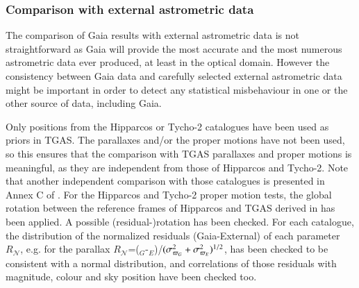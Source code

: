 
\subsubsection{Comparison with external astrometric data}\label{sec:wp944_astrom}

The comparison of Gaia results with external astrometric data is not straightforward as Gaia will provide the most accurate and the most numerous astrometric data ever produced, at least in the optical domain. However the consistency between Gaia data and carefully selected external astrometric data might be important in order to detect any statistical misbehaviour in one or the other source of data, including Gaia.

Only positions from the Hipparcos or Tycho-2 catalogues have been used as priors in TGAS. The parallaxes and/or the proper motions have not been used, so this ensures that the comparison with TGAS parallaxes and proper motions is meaningful, as they are independent from those of Hipparcos and Tycho-2. Note that another independent comparison with those catalogues is presented in Annex C of \cite{DPACP-14}.
For the Hipparcos and Tycho-2 proper motion tests, the global rotation between the reference frames of Hipparcos and TGAS derived in \cite{DPACP-14} has been applied. A possible (residual-)rotation has been checked. 
For each catalogue, the distribution of the normalized residuals (Gaia-External) of each parameter $R_\mathcal{N}$, e.g. for the parallax $R_\mathcal{N}$=(\parallax$_G$-\parallax$_{E}$)/$({\sigma_{\text{$\varpi$}_G}^2+\sigma_{\text{$\varpi$}_{E}}^2})^{1/2}$, has been checked to be consistent with a normal distribution, and correlations of those residuals with magnitude, colour and sky position have been checked too. 

